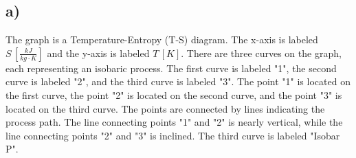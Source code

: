 

\subsection*{a)}

The graph is a Temperature-Entropy (T-S) diagram. The x-axis is labeled \( S \, [\frac{kJ}{kg \cdot K}] \) and the y-axis is labeled \( T \, [K] \). There are three curves on the graph, each representing an isobaric process. The first curve is labeled "1", the second curve is labeled "2", and the third curve is labeled "3". The point "1" is located on the first curve, the point "2" is located on the second curve, and the point "3" is located on the third curve. The points are connected by lines indicating the process path. The line connecting points "1" and "2" is nearly vertical, while the line connecting points "2" and "3" is inclined. The third curve is labeled "Isobar P".